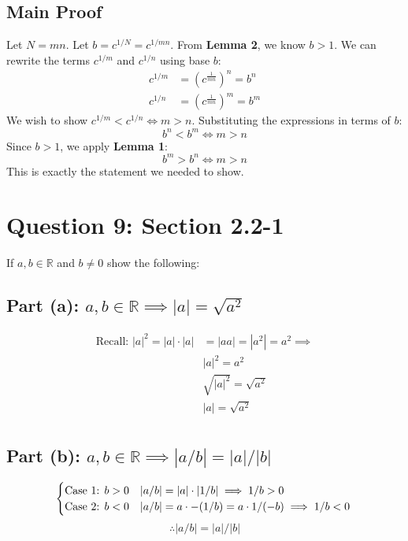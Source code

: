 \documentclass[11pt]{article}
\theoremstyle{plain}
\begin{document}
\subsection*{Main Proof}
Let $N = mn$. Let $b = c^{1/N} = c^{1/mn}$.
From \textbf{Lemma 2}, we know $b > 1$.
We can rewrite the terms $c^{1/m}$ and $c^{1/n}$ using base $b$:
\[
	\begin{aligned}
		c^{1/m} & = (c^{\frac{1}{mn}})^n = b^n \\
		c^{1/n} & = (c^{\frac{1}{mn}})^m = b^m
	\end{aligned}
\]
We wish to show $c^{1/m} < c^{1/n} \iff m > n$.
Substituting the expressions in terms of $b$:
\[
	b^n < b^m \iff m > n
\]
Since $b > 1$, we apply \textbf{Lemma 1}:
\[
	b^m > b^n \iff m > n
\]
This is exactly the statement we needed to show.
\section*{Question 9: Section 2.2-1}
\begin{center}
    If $a,b \in \mathbb{R}$ and $b \neq 0$ show the following:
\end{center}
\subsection*{Part (a): $a,b \in \mathbb{R} \implies |a| = \sqrt{a^2}$}
\[
	\begin{aligned}
		\text{Recall: } |a|^2 = |a| \cdot |a| & = |aa| = |a^2| = a^2 \implies \\
		                                      & |a|^2 = a^2                   \\
		                                      & \sqrt{|a|^2} = \sqrt{a^2}     \\
		                                      & |a| = \sqrt{a^2}              \\
	\end{aligned}
\]
\subsection*{Part (b): $a,b \in \mathbb{R} \implies |a/b| = |a|/|b|$}
\[
    \begin{cases}
        \text{Case 1: } b>0 & |a/b|= |a| \cdot |1/b| \implies 1/b >0           \\
        \text{Case 2: } b<0 & |a/b|= a \cdot -(1/b) = a \cdot 1/(-b) \implies 1/b<0 
    \end{cases} \\
\]
\[
	\therefore |a/b| = |a|/|b|
\]
\end{document}
